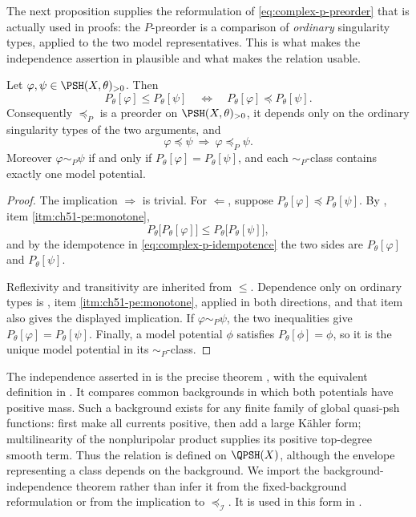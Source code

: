 The next proposition supplies the reformulation of
\eqref{eq:complex-p-preorder} that is actually used in proofs: the
$P$-preorder is a comparison of \emph{ordinary} singularity types,
applied to the two model representatives.  This is what makes the
independence assertion in  plausible and
what makes the relation usable.

\begin{proposition}\label{prop:ch51-p-preorder-reformulation}
Let $\varphi,\psi\in\PSH(X,\theta)_{>0}$.  Then
\[
 P_\theta[\varphi]\leq P_\theta[\psi]
 \quad\Longleftrightarrow\quad
 P_\theta[\varphi]\preceq P_\theta[\psi].
\]
Consequently $\preceq_P$ is a preorder on
$\PSH(X,\theta)_{>0}$, it depends only on the ordinary singularity
types of the two arguments, and
\[
 \varphi\preceq\psi\ \Longrightarrow\ \varphi\preceq_P\psi .
\]
Moreover $\varphi\sim_P\psi$ if and only if
$P_\theta[\varphi]=P_\theta[\psi]$, and each $\sim_P$-class contains
exactly one model potential.
\end{proposition}

\begin{proof}
The implication $\Rightarrow$ is trivial.  For $\Leftarrow$, suppose
$P_\theta[\varphi]\preceq P_\theta[\psi]$.  By
, item \cref{itm:ch51-pe:monotone},
\[
 P_\theta\bigl[P_\theta[\varphi]\bigr]
 \leq
 P_\theta\bigl[P_\theta[\psi]\bigr],
\]
and by the idempotence in \eqref{eq:complex-p-idempotence} the two sides
are $P_\theta[\varphi]$ and $P_\theta[\psi]$.

Reflexivity and transitivity are inherited from $\leq$.  Dependence
only on ordinary types is
, item \cref{itm:ch51-pe:monotone}, applied
in both directions, and that item also gives the displayed implication.
If $\varphi\sim_P\psi$, the two inequalities give
$P_\theta[\varphi]=P_\theta[\psi]$.  Finally, a model potential
$\phi$ satisfies $P_\theta[\phi]=\phi$, so it is the unique model
potential in its $\sim_P$-class.
\end{proof}

\begin{remark}
\label{rem:ch51-p-preorder-background}
The independence asserted in  is the
precise theorem \cite[Lemma~6.1.1]{XiaBook}, with the equivalent
definition in \cite[Definition~6.1.1]{XiaBook}.  It compares common
backgrounds in which both potentials have positive mass.  Such a
background exists for any finite family of global quasi-psh functions:
first make all currents positive, then add a large K\"ahler form;
multilinearity of the nonpluripolar product supplies its positive
top-degree smooth term.  Thus the relation is defined on $\QPSH(X)$,
although the envelope representing a class depends on the background.
We import the background-independence theorem rather than infer it from
the fixed-background reformulation or from the implication to
$\preceq_{\mathcal I}$.  It is used in this form in
.
\end{remark}

